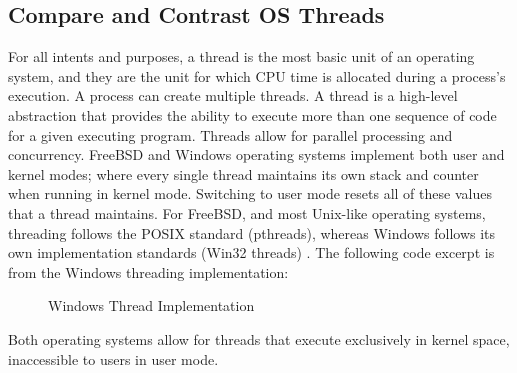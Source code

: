 \documentclass[onecolumn, draftclsnofoot,10pt, compsoc]{IEEEtran}
\begin{document}
\subsection{Compare and Contrast OS Threads}
\noindent For all intents and purposes, a thread is the most basic unit of an operating system, and they are the unit for which CPU time is allocated during a process’s execution. A process can create multiple threads. A thread is a high-level abstraction that provides the ability to execute more than one sequence of code for a given executing program. Threads allow for parallel processing and concurrency. FreeBSD and Windows operating systems implement both user and kernel modes; where every single thread maintains its own stack and counter when running in kernel mode. Switching to user mode resets all of these values that a thread maintains. For FreeBSD, and most Unix-like operating systems, threading follows the POSIX standard (pthreads), whereas Windows follows its own implementation standards (Win32 threads) \cite{MSWindows1PTCS} \cite{FreeBSD2PTCS} \cite{PsCreateSystemThread} \cite{MSWindows3PTCS}. The following code excerpt is from the Windows threading implementation:\\

\begin{figure}[H]
    \centering
    
    \caption{Windows Thread Implementation}
    \label{fig:win1}
\end{figure}

\noindent Both operating systems allow for threads that execute exclusively in kernel space, inaccessible to users in user mode.\\
\end{document}
